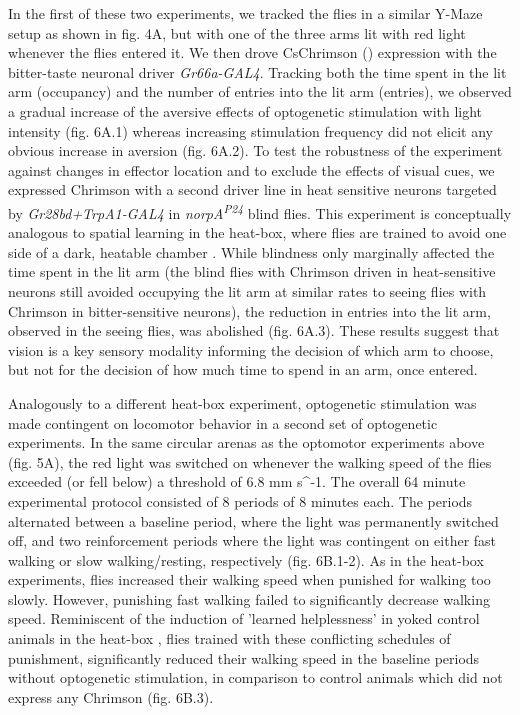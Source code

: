 \documentclass[10pt]{article}
\begin{document}
\begin{multicols}{2}
In the first of these two experiments, we tracked the flies in a similar Y-Maze setup as shown in fig. 4A, but with one of the three arms lit with red light whenever the flies entered it. We then drove CsChrimson (\cite{griebel_2014,Klapoetke_Independent_2014}) expression with the bitter-taste neuronal driver \textit{Gr66a-GAL4}. Tracking both the time spent in the lit arm (occupancy) and the number of entries into the lit arm (entries), we observed a gradual increase of the aversive effects of optogenetic stimulation with light intensity (fig. 6A.1) whereas increasing stimulation frequency did not elicit any obvious increase in aversion (fig. 6A.2). To test the robustness of the experiment against changes in effector location and to exclude the effects of visual cues, we expressed Chrimson with a second driver line in heat sensitive neurons targeted by \textit{Gr28bd+TrpA1-GAL4} in \textit{norpA\textsuperscript{P24}} blind flies. This experiment is conceptually analogous to spatial learning in the heat-box, where flies are trained to avoid one side of a dark, heatable chamber \cite{wustmann_rein_wolf_heisenberg_1996,wustmann_heisenberg_1997,diegelmann_2006,ostrowski_kahsai_kramer_knutson_zars_2015,putz_2002,sitaraman_zars_zars_2007,sitaraman_zars_zars_2010,zars_zars_2006}. While blindness only marginally affected the time spent in the lit arm (the blind flies with Chrimson driven in heat-sensitive neurons still avoided occupying the lit arm at similar rates to seeing flies with Chrimson in bitter-sensitive neurons), the reduction in entries into the lit arm, observed in the seeing flies, was abolished (fig. 6A.3). These results suggest that vision is a key sensory modality informing the decision of which arm to choose, but not for the decision of how much time to spend in an arm, once entered.

Analogously to a different heat-box experiment\cite{YANG2013799}, optogenetic stimulation was made contingent on locomotor behavior in a second set of optogenetic experiments. In the same circular arenas as the optomotor experiments above (fig. 5A), the red light was switched on whenever the walking speed of the flies exceeded (or fell below) a threshold of 6.8 mm s^{-1}. The overall 64 minute experimental protocol consisted of 8 periods of 8 minutes each. The periods alternated between a baseline period, where the light was permanently switched off, and two reinforcement periods where the light was contingent on either fast walking or slow walking/resting, respectively (fig. 6B.1-2). As in the heat-box experiments, flies increased their walking speed when punished for walking too slowly. However, punishing fast walking failed to significantly decrease walking speed. Reminiscent of the induction of 'learned helplessness' in yoked control animals in the heat-box \cite{YANG2013799}, flies trained with these conflicting schedules of punishment, significantly reduced their walking speed in the baseline periods without optogenetic stimulation, in comparison to control animals which did not express any Chrimson (fig. 6B.3).



\end{multicols}
\end{document}
